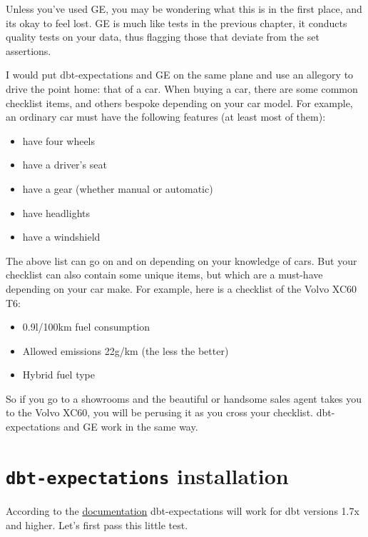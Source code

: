 \documentclass[
]{book}
\providecommand{\tightlist}{%
  \setlength{\itemsep}{0pt}\setlength{\parskip}{0pt}}
\begin{document}
Unless you've used GE, you may be wondering what this is in the first place, and its okay to feel lost. GE is much like tests in the previous chapter, it conducts quality tests on your data, thus flagging those that deviate from the set assertions.

I would put dbt-expectations and GE on the same plane and use an allegory to drive the point home: that of a car. When buying a car, there are some common checklist items, and others bespoke depending on your car model. For example, an ordinary car must have the following features (at least most of them):

\begin{itemize}
\tightlist
\item
  have four wheels
\item
  have a driver's seat
\item
  have a gear (whether manual or automatic)
\item
  have headlights
\item
  have a windshield
\end{itemize}

The above list can go on and on depending on your knowledge of cars. But your checklist can also contain some unique items, but which are a must-have depending on your car make. For example, here is a checklist of the Volvo XC60 T6:

\begin{itemize}
\tightlist
\item
  0.9l/100km fuel consumption
\item
  Allowed emissions 22g/km (the less the better)
\item
  Hybrid fuel type
\end{itemize}

So if you go to a showrooms and the beautiful or handsome sales agent takes you to the Volvo XC60, you will be perusing it as you cross your checklist. dbt-expectations and GE work in the same way.

\hypertarget{dbt-expectations-installation}{%
\section{\texorpdfstring{\texttt{dbt-expectations} installation}{dbt-expectations installation}}\label{dbt-expectations-installation}}

According to the \href{https://hub.getdbt.com/calogica/dbt_expectations/latest/}{documentation} dbt-expectations will work for dbt versions 1.7x and higher. Let's first pass this little test.
\end{document}
